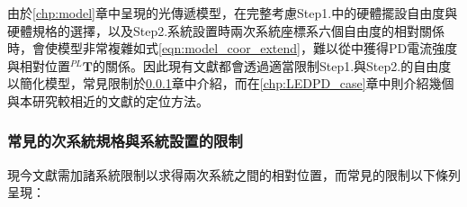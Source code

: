 由於\ref{chp:model}章中呈現的光傳遞模型，在完整考慮Step1.中的硬體擺設自由度與硬體規格的選擇，以及Step2.系統設置時兩次系統座標系六個自由度的相對關係時，會使模型非常複雜如式\ref{eqn:model_coor_extend}，難以從中獲得PD電流強度與相對位置$^{PL}\boldsymbol{T}$的關係。因此現有文獻都會透過適當限制Step1.與Step2.的自由度以簡化模型，常見限制於\ref{chp:LEDPD_restrict}章中介紹，而在\ref{chp:LEDPD_case}章中則介紹幾個與本研究較相近的文獻的定位方法。

    \subsubsection{常見的次系統規格與系統設置的限制}
    \label{chp:LEDPD_restrict}

    現今文獻需加諸系統限制以求得兩次系統之間的相對位置，而常見的限制以下條列呈現：

    

